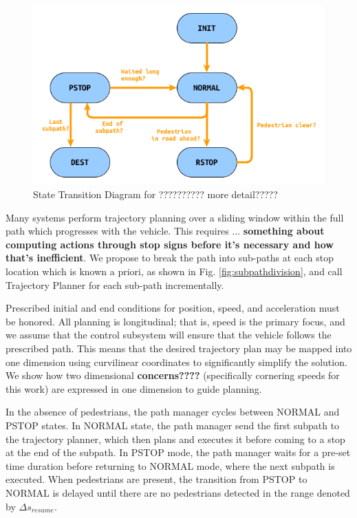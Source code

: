 \documentclass[letterpaper, 10 pt, conference]{ieeeconf}  %
\begin{document}
\begin{figure}[thpb]
  \centering
  \includegraphics[width=1.0\columnwidth]{graphics/StateMachineSimple.png}
  \caption{State Transition Diagram for ?????????? more detail????? }
  \label{fig:st}
\end{figure}

Many systems perform trajectory planning over a sliding window within the full path which progresses with the vehicle.
This requires ... \textbf{something about computing actions through stop signs before it's necessary and how that's inefficient}.
We propose to break the path into sub-paths at each stop location which is known a priori, as shown in Fig. \ref{fig:subpathdivision}, and call Trajectory Planner for each sub-path incrementally.

Prescribed initial and end conditions for position, speed, and acceleration must be honored.
All planning is longitudinal; that is, speed is the primary focus, and we assume that the control subsystem will ensure that the vehicle follows the prescribed path.
This means that the desired trajectory plan may be mapped into one dimension using curvilinear coordinates to significantly simplify the solution.
We show how two dimensional \textbf{concerns????} (specifically cornering speeds for this work) are expressed in one dimension to guide planning.

In the absence of pedestrians, the path manager cycles between NORMAL and PSTOP states.
In NORMAL state, the path manager send the first subpath to the trajectory planner, which then plans and executes it before coming to a stop at the end of the subpath.
In PSTOP mode, the path manager waits for a pre-set time duration before returning to NORMAL mode, where the next subpath is executed.
When pedestrians are present, the transition from PSTOP to NORMAL is delayed until there are no pedestrians detected in the range denoted by $\Delta s_{resume}$.
\end{document}
